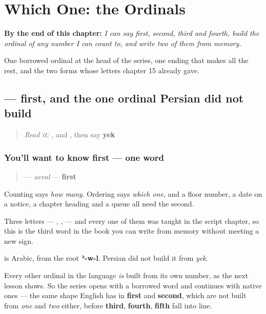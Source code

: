 
\chapter{Which One: the Ordinals}
\label{ch:fa-ordinals}

\begin{chapteropening}
\textbf{By the end of this chapter:} \emph{I can say first, second, third and fourth, build the ordinal of any number I can count to, and write two of them from memory.}

One borrowed ordinal at the head of the series, one ending that makes all the rest, and the two forms whose letters chapter 15 already gave.
\end{chapteropening}

\section[\texorpdfstring{\fa{اول} (avval)}{اول (avval)}]{ — first, and the one ordinal Persian did not build}

\label{lesson:FA-C20-avval}



\begin{quote}
\emph{Read it:} \textbf{}, \textbf{} and \textbf{}, then say \textbf{yek}
\end{quote}

\subsection*{You'll want to know first — one word}
\begin{quote}
\textbf{} — \emph{avval} — \textbf{first}
\end{quote}

Counting says \emph{how many}. Ordering says \emph{which one}, and a floor number, a date on a notice, a chapter heading and a queue all need the second.

Three letters — \textbf{}, \textbf{}, \textbf{} — and every one of them was taught in the script chapter, so this is the third word in the book you can write from memory without meeting a new sign.

\begin{cousinweb}
\textbf{} is Arabic, from the root \textbf{ʾ-w-l}. Persian did not build it from \emph{yek}.

Every other ordinal in the language \emph{is} built from its own number, as the next lesson shows. So the series opens with a borrowed word and continues with native ones — the same shape English has in \textbf{first} and \textbf{second}, which are not built from \emph{one} and \emph{two} either, before \textbf{third}, \textbf{fourth}, \textbf{fifth} fall into line.
\end{cousinweb}


